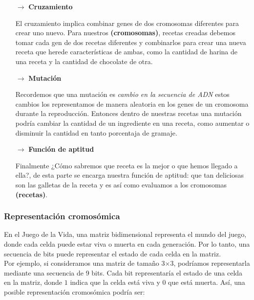 \begin{itemize}
    \item[$\rightarrow$] \textbf{Cruzamiento}

    El cruzamiento implica combinar genes de dos cromosomas diferentes para crear uno nuevo. 
    Para nuestros \textbf{(cromosomas)}, recetas creadas debemos tomar cada gen de dos recetas 
    diferentes y combinarlos para crear una nueva receta que herede características de ambas, 
    como la cantidad de harina de una receta y la cantidad de chocolate de otra.

    \item[$\rightarrow$] \textbf{Mutación}
    
    Recordemos que una mutación es \textit{cambio en la secuencia de ADN} estos cambios los 
    representamos de manera aleatoria en los genes de un cromosoma durante la reproducción.
    Entonces dentro de nuestras recetas una mutación podría cambiar la cantidad de un ingrediente 
    en una receta, como aumentar o disminuir la cantidad en tanto porcentaja de gramaje. 

    \item[$\rightarrow$] \textbf{Función de aptitud}
    
    Finalmente ¿Cómo sabremos que receta es la mejor o que hemos llegado a ella?, de esta parte 
    se encarga nuestra función de aptitud: que tan deliciosas son las galletas de la receta y es 
    así como evaluamos a los cromosomas \textbf{(recetas)}. 
\end{itemize}

\subsubsection*{Representación cromosómica}

En el Juego de la Vida, una matriz bidimensional representa el mundo del juego, donde cada celda 
puede estar viva o muerta en cada generación. Por lo tanto, una secuencia de bits puede representar 
el estado de cada celda en la matriz.\\ 

Por ejemplo, si consideramos una matriz de tamaño 3$\times$3, podríamos representarla mediante una 
secuencia de 9 bits. Cada bit representaría el estado de una celda en la matriz, donde $1$ indica 
que la celda está viva y $0$ que está muerta. Así, una posible representación cromosómica podría ser:

